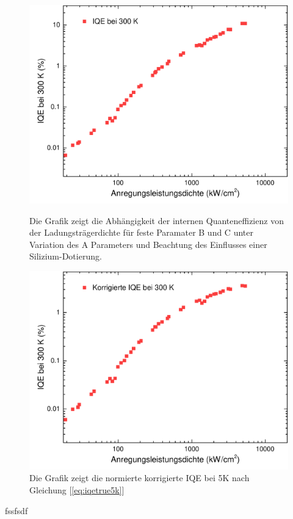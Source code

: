 %
\begin{figure}[h]
    \centering
    \begin{minipage}[t]{0.49\linewidth}
        \centering
        \includegraphics[width=\linewidth]{Bilder/StandardIQE300K.pdf}
        \caption{Die Grafik zeigt die Abhängigkeit der internen Quanteneffizienz von der Ladungsträgerdichte für feste Paramater B und C unter Variation des A Parameters und Beachtung des Einflusses einer Silizium-Dotierung.}
        \label{fig:standiqe300k}
    \end{minipage}%
    \hfill
    \begin{minipage}[t]{0.49\linewidth}
        \centering
        \includegraphics[width=\linewidth]{Bilder/KorrigierteIQE300K.pdf}
        \caption{Die Grafik zeigt die normierte korrigierte IQE bei 5K nach Gleichung [\ref{eq:iqetrue5k}] }
        \label{fig:trueiqe300k}
    \end{minipage}
\end{figure}
\vspace{1cm}
\raggedright
%
fssfsdf
